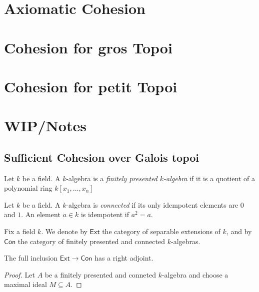 \section{Axiomatic Cohesion}
\section{Cohesion for gros Topoi}
\section{Cohesion for petit Topoi}
\section{WIP/Notes}

\subsection{Sufficient Cohesion over Galois topoi}
\begin{definition}
  Let $k$ be a field. A $k$-algebra is a \textit{finitely presented $k$-algebra} if it is a quotient of a polynomial ring $k[x_1, \dots, x_n]$
\end{definition}

\begin{definition}
  Let $k$ be a field. A $k$-algebra is \textit{connected} if its only idempotent elements are $0$ and $1$. An element $a \in k$ is idempotent if $a^2 = a$.
\end{definition}
Fix a field $k$.  We denote by $\mathsf{Ext}$ the category of separable extensions of $k$, and by $\mathsf{Con}$ the category of finitely presented and connected $k$-algebras.

\begin{lemma}
  The full inclusion $\mathsf{Ext} \longrightarrow \mathsf{Con}$ has a right adjoint.
\end{lemma}
\begin{proof}
  Let $A$ be a finitely presented and conneted $k$-algebra and choose a maximal ideal $M \subseteq A$.
\end{proof}
